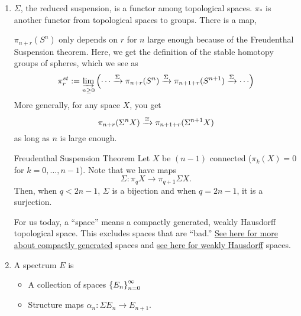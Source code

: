 \begin{enumerate}
    \item $\Sigma$, the reduced suspension, is a functor among topological spaces. $\pi_\ast$ is another functor from topological spaces to groups. There is a map, \begin{center}
    \end{center}
    $\pi_{n+r}(S^n)$ only depends on $r$ for $n$ large enough because of the {Freudenthal Suspension theorem}. Here, we get the definition of the stable homotopy groups of spheres, which we see as $$\pi_r^{st}:=\varinjlim_{n\geq 0}\parenths{\cdots\xr{\Sigma}\pi_{n+r}(S^n)\xr{\Sigma}\pi_{n+1+r}(S^{n+1})\xr{\Sigma}\cdots}$$
    More generally, for any space $X$, you get $$\pi_{n+r}(\Sigma^n X)\xrightarrow{\cong}\pi_{n+1+r}(\Sigma^{n+1}X)$$ as long as $n$ is large enough. 
    \begin{theorem}{Freudenthal Suspension Theorem}{}
        Let $X$ be $(n-1)$ connected ($\pi_k(X)=0$ for $k = 0,\dots, n-1$). Note that we have maps $$\Sigma:\pi_qX\to \pi_{q+1}\Sigma X.$$ Then, when $q<2n-1$, $\Sigma$ is a bijection and when $q = 2n-1$, it is a surjection.
    \end{theorem}
    For us today, a ``space'' means a compactly generated, weakly Hausdorff topological space. This excludes spaces that are ``bad.'' \href{https://en.wikipedia.org/wiki/Compactly_generated_space}{See here for more about compactly generated} spaces and  \href{https://en.wikipedia.org/wiki/Weak_Hausdorff_space}{see here for weakly Hausdorff} spaces. 
    \item A spectrum $E$ is 
    \begin{itemize}
        \item A collection of spaces $\left\{ E_n \right\}_{n=0}^\infty$
        \item Structure maps $\alpha_n:\Sigma E_n\to E_{n+1}$. 
    \end{itemize}
    \begin{example}{}{}
        \begin{multicols*}{2}

\end{multicols*}
\end{example}
\end{enumerate}
